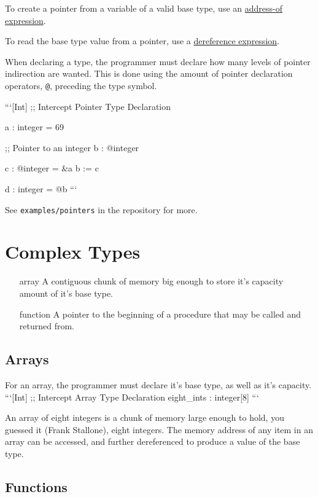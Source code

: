 \documentclass[12pt]{report}
\begin{document}
To create a pointer from a variable of a valid base type, use an \hyperref[sec:expressions-address_of]{address-of expression}.

To read the base type value from a pointer, use a \hyperref[sec:expressions-dereference]{dereference expression}.

When declaring a type, the programmer must declare how many levels of pointer indirection are wanted. This is done using the amount of pointer declaration operators, \verb|@|, preceding the type symbol.

```[Int]
;; Intercept Pointer Type Declaration

a : integer = 69

;; Pointer to an integer
b : @integer

c : @integer = &a
b := c

d : integer = @b
```

See \verb|examples/pointers| in the repository for more.

\section{Complex Types}
\label{sec:types-complex_types}

\begin{itemize}
\item[array]    A contiguous chunk of memory big enough to store it's capacity amount of it's base type.
\item[function] A pointer to the beginning of a procedure that may be called and returned from.
\end{itemize}

\subsection*{Arrays}
\label{subsec:types-complex_types-arrays}
For an array, the programmer must declare it's base type, as well as it's capacity.
```[Int]
;; Intercept Array Type Declaration
eight_ints : integer[8]
```

An array of eight integers is a chunk of memory large enough to hold, you guessed it (Frank Stallone), eight integers. The memory address of any item in an array can be accessed, and further dereferenced to produce a value of the base type.

\subsection*{Functions}
\label{subsec:types-complex_types-functions}
\end{document}
